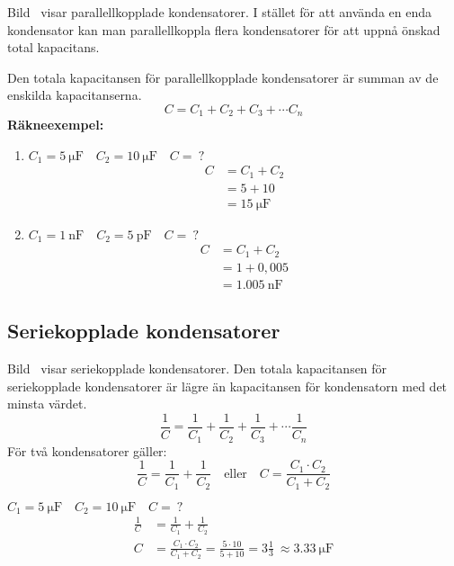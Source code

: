 
Bild~ visar parallellkopplade kondensatorer.
I stället för att använda en enda kondensator kan man parallellkoppla flera
kondensatorer för att uppnå önskad total kapacitans.

Den totala kapacitansen för parallellkopplade kondensatorer är summan av de
enskilda kapacitanserna.
%
\[
  C = C_1 + C_2 + C_3 + \cdots C_n
\]
%
\textbf{Räkneexempel:}
\begin{enumerate}
\item \(C_1 = \qty{5}{\micro\farad} \quad C_2 = \qty{10}{\micro\farad} \quad C =\ ?\)
  \begin{align*}
    C &= C_1 + C_2 \\[1ex]
    &= 5 + 10 \\[1ex]
    &= \qty{15}{\micro\farad}
  \end{align*}
\item \(C_1 = \qty{1}{\nano\farad} \quad C_2 = \qty{5}{\pico\farad} \quad C =\ ?\)
  \begin{align*}
    C &= C_1 + C_2 \\[1ex]
    &= 1 + 0,005 \\[1ex]
    &= \qty{1,005}{\nano\farad}
  \end{align*}
\end{enumerate}

\subsection{Seriekopplade kondensatorer}
\label{seriekopplade_kondensatorer}


Bild~ visar seriekopplade kondensatorer.
Den totala kapacitansen för seriekopplade kondensatorer är lägre än kapacitansen
för kondensatorn med det minsta värdet.
%
\[
\frac{1}{C} = \frac{1}{C_1} + \frac{1}{C_2} +
\frac{1}{C_3} + \cdots \frac{1}{C_n}
\]
%
För två kondensatorer gäller:
\[
  \frac{1}{C} = \frac{1}{C_1} + \frac{1}{C_2} \quad \text{eller} \quad
  C = \frac{C_1 \cdot C_2}{C_1 + C_2}
\]
\begin{exempelbox}
 \(C_1 = \qty{5}{\micro\farad} \quad C_2 = \qty{10}{\micro\farad} \quad C =\ ?\)
 \tcblower
    \begin{align*}
      \frac{1}{C} &= \frac{1}{C_1} + \frac{1}{C_2} \\[1ex]
      C &= \frac{C_1 \cdot C_2}{C_1 + C_2}
      = \frac{5 \cdot 10}{5 + 10}
      = 3\frac{1}{3}\
      \approx \qty{3,33}{\micro\farad}
    \end{align*}
\end{exempelbox}


